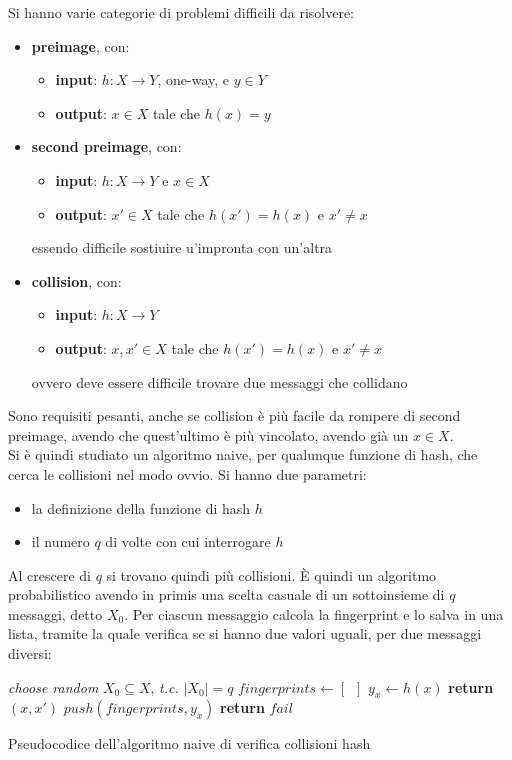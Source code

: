 \documentclass[a4paper,12pt, oneside]{book}
\begin{document}
Si hanno varie categorie di problemi difficili da risolvere:
\begin{itemize}
  \item \textbf{preimage}, con:
  \begin{itemize}
    \item \textbf{input}: $h:X\to Y$, one-way, e $y\in Y$
    \item \textbf{output}: $x\in X$ tale che $h(x)=y$
  \end{itemize}
  \item \textbf{second preimage}, con:
  \begin{itemize}
    \item \textbf{input}: $h:X\to Y$ e $x\in X$
    \item \textbf{output}: $x'\in X$ tale che $h(x')=h(x)$ e $x'\neq x$
  \end{itemize}
  essendo difficile sostiuire u'impronta con un'altra
  \item \textbf{collision}, con:
  \begin{itemize}
    \item \textbf{input}: $h:X\to Y$
    \item \textbf{output}: $x,x'\in X$ tale che $h(x')=h(x)$ e $x'\neq x$
  \end{itemize}
  ovvero deve essere difficile trovare due messaggi che collidano
\end{itemize}
Sono requisiti pesanti, anche se collision è più facile da rompere di second
preimage, avendo che quest'ultimo è più vincolato, avendo già un $x\in X$. \\
Si è quindi studiato un algoritmo naive, per qualunque funzione di hash, che
cerca le collisioni nel modo ovvio. Si hanno due parametri:
\begin{itemize}
  \item la definizione della funzione di hash $h$
  \item il numero $q$ di volte con cui interrogare $h$
\end{itemize}
Al crescere di $q$ si trovano quindi più collisioni. È quindi un algoritmo
probabilistico avendo in primis una scelta casuale di un sottoinsieme di $q$
messaggi, detto $X_0$. Per ciascun messaggio calcola la fingerprint e lo salva
in una lista, tramite la quale verifica se si hanno due valori uguali, per due
messaggi diversi:
\begin{algorithm}[H]
  \small
  \begin{algorithmic}
    \State \textit{choose random }$X_0\subseteq X$, \textit{t.c.} $|X_0|=q$
    \State $fingerprints\gets [\,\,\,]$
    \State $y_x\gets h(x)$
    \State \textbf{return} $(x,x')$
    \Else
    \State $push(fingerprints, y_x)$
    \EndIf
    \EndFor
    \State \textbf{return} $fail$
    \EndFunction
  \end{algorithmic}
  \label{algo:h1}
  \caption{Pseudocodice dell'algoritmo naive di verifica collisioni hash}
\end{algorithm}
\end{document}
